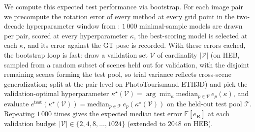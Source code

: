 \documentclass{article}
\newcommand{\mname}[1]{\texorpdfstring{#1\xspace}{#1}}
\newcommand{\phototourism}{\mname{PhotoTourism}}
\newcommand{\ethd}{\mname{ETH3D}}
\newcommand{\heb}{\mname{HEB}}
\begin{document}
We compute this expected test performance via bootstrap.  For
each image pair we precompute the rotation error of every
method at every grid point in the two-decade hyperparameter
window from : $1\,000$ minimal-sample
models are drawn per pair, scored at every hyperparameter
$\kappa$, the best-scoring model is selected at each $\kappa$,
and its error against the GT pose is recorded.  With these errors
cached, the bootstrap loop is fast: draw a validation set
$\mathcal{V}$ of cardinality $|\mathcal{V}|$ (on \heb, sampled
from a random subset of scenes held out for validation, with the
disjoint remaining scenes forming the test pool, so trial
variance reflects cross-scene generalization; split at the pair
level on \phototourism and \ethd) and pick the
validation-optimal hyperparameter
$\kappa^\star(\mathcal{V}) = \arg\min_\kappa
	\mathrm{median}_{p \in \mathcal{V}}\, e_p(\kappa)$, and
evaluate $e^{\mathrm{test}}(\kappa^\star(\mathcal{V})) =
	\mathrm{median}_{p \in \mathcal{T}}\, e_p(\kappa^\star(\mathcal{V}))$
on the held-out test pool $\mathcal{T}$.  Repeating $1\,000$
times gives the expected median test error
$\mathbb{E}[e_{\mathbf{R}}]$ at each validation budget
$|\mathcal{V}| \in \{2, 4, 8, \ldots, 1024\}$ (extended to
$2048$ on \heb).
\end{document}
